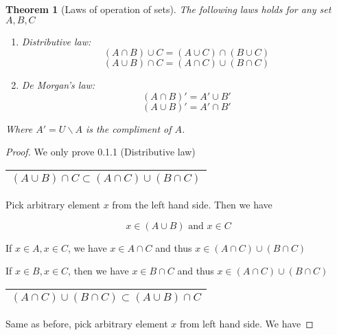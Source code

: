 \documentclass{article}
\theoremstyle{MyNonumberplain}
\theoremstyle{break}
\newtheorem*{proof}{Proof. }
\theoremstyle{break}
\newtheorem{theorem}{Theorem}[section]
\theoremstyle{break}
\theoremstyle{definition}
\theoremstyle{break}
\begin{document}
\begin{thmbox}
    \begin{theorem}[Laws of operation of sets]
        The following laws holds for any set $A,B,C$ \bigskip
        \begin{enumerate}
            \item Distributive law:\bigskip
                    $$(A\cap B)\cup C=(A\cup C)\cap (B\cup C)$$
                    $$(A\cup B)\cap C=(A\cap C)\cup (B\cap C)$$
            \item De Morgan's law:\bigskip
                    $$(A\cap B)'=A' \cup B'$$
                    $$(A\cup B)'=A' \cap B'$$
        \end{enumerate}
        Where $A'= U \backslash A$ is the compliment of $A$.
    \end{theorem}    
    \begin{prfbox}
        \begin{proof}
            We only prove 0.1.1 (Distributive law)
            \bigskip\newline
            \begin{tabular}{|c|}
              \hline
              $(A \cup B) \cap C \subset (A \cap C) \cup (B \cap C)$\\
              \hline
            \end{tabular}

            \bigskip

            Pick arbitrary element $x$ from the left hand side. Then we have

            \[ x \in (A \cup B) \text{ and } x \in C \]

            \bigskip

            If $x \in A, x \in C$, we have $x \in A \cap C$ and thus $x \in (A \cap
            C) \cup (B \cap C)$

            \bigskip

            If $x \in B, x \in C$, then we have $x \in B \cap C$ and thus $x \in (A \cap
            C) \cup (B \cap C)$

            \bigskip

            \begin{tabular}{|c|}
              \hline
              $(A \cap C) \cup (B \cap C) \subset (A \cup B) \cap C$\\
              \hline
            \end{tabular}
            \bigskip

            Same as before, pick arbitrary element $x$ from left hand side. We have


\end{proof}
\end{prfbox}
\end{thmbox}
\end{document}
